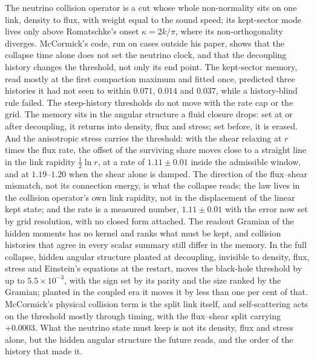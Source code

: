 \documentclass[11pt]{article}
\begin{document}
The neutrino collision operator is a cut whose whole non-normality sits on one link, density to flux, with weight equal to the sound speed; its kept-sector mode lives only above Romatschke's onset $\kappa=2k/\pi$, where its non-orthogonality diverges. McCormick's code, run on cases outside his paper, shows that the collapse time alone does not set the neutrino clock, and that the decoupling history changes the threshold, not only its end point. The kept-sector memory, read mostly at the first compaction maximum and fitted once, predicted three histories it had not seen to within $0.071$, $0.014$ and $0.037$, while a history-blind rule failed. The steep-history thresholds do not move with the rate cap or the grid. The memory sits in the angular structure a fluid closure drops: set at or after decoupling, it returns into density, flux and stress; set before, it is erased. And the anisotropic stress carries the threshold: with the shear relaxing at $r$ times the flux rate, the offset of the surviving share moves close to a straight line in the link rapidity $\tfrac12\ln r$, at a rate of $1.11\pm0.01$ inside the admissible window, and at $1.19$--$1.20$ when the shear alone is damped. The direction of the flux--shear mismatch, not its connection energy, is what the collapse reads; the law lives in the collision operator's own link rapidity, not in the displacement of the linear kept state; and the rate is a measured number, $1.11\pm0.01$ with the error now set by grid resolution, with no closed form attached. The readout Gramian of the hidden moments has no kernel and ranks what must be kept, and collision histories that agree in every scalar summary still differ in the memory. In the full collapse, hidden angular structure planted at decoupling, invisible to density, flux, stress and Einstein's equations at the restart, moves the black-hole threshold by up to $5.5\times10^{-3}$, with the sign set by its parity and the size ranked by the Gramian; planted in the coupled era it moves it by less than one per cent of that. McCormick's physical collision term is the split link itself, and self-scattering acts on the threshold mostly through timing, with the flux--shear split carrying $+0.0003$. What the neutrino state must keep is not its density, flux and stress alone, but the hidden angular structure the future reads, and the order of the history that made it.
\end{document}
